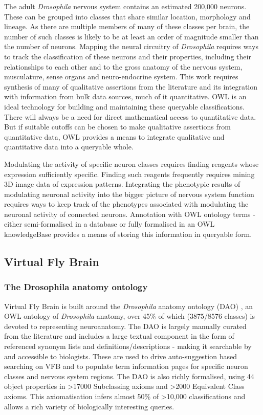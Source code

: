 \documentclass[runningheads,a4paper]{llncs}
\begin{document}
The adult \textit{Drosophila} nervous system contains an estimated
200,000 neurons.  These can be grouped into classes that share
similar location, morphology and lineage.  As there are multiple
members of many of these classes per brain, the number of such classes
is likely to be at least an order of magnitude smaller than the number
of neurons.  Mapping the neural circuitry of \textit{Drosophila}
requires ways to track the classification of these neurons and their
properties, including their relationships to each other and to the
gross anatomy of the nervous system, musculature, sense organs and
neuro-endocrine system.  This work requires synthesis of many of
qualitative assertions from the literature and its integration with
information from bulk data sources, much of it quantitative.  OWL
is an ideal technology for building and maintaining these queryable
classifications. There will always be a need for direct mathematical
access to quantitative data.  But if suitable cutoffs can be
chosen to make qualitative assertions from quantitative data, OWL
provides a means to integrate qualitative and quantitative data into a
queryable whole.

Modulating the activity of specific neuron classes requires finding
reagents whose expression sufficiently specific. Finding such reagents
frequently requires mining 3D image data of expression patterns.
Integrating the phenotypic results of modulating neuronal activity
into the bigger picture of nervous system function requires ways to
keep track of the phenotypes associated with modulating the neuronal
activity of connected neurons.  Annotation with OWL ontology terms -
either semi-formalised in a database or fully formalised in an OWL
knowledgeBase provides a means of storing this information in
queryable form.

\subsection{Virtual Fly Brain}

\subsubsection{The Drosophila anatomy ontology}

Virtual Fly Brain is built around the \textit{Drosophila} anatomy
ontology (DAO) \cite{Costa2013}, an OWL ontology of
\textit{Drosophila} anatomy, over 45\% of which (3875/8576 classes) is
devoted to representing neuroanatomy. The DAO is largely manually
curated from the literature and includes a large textual component in
the form of referenced synonym lists and definitions/descriptions -
making it searchable by and accessible to biologists.  These are used
to drive auto-suggestion based searching on VFB and to populate term
information pages for specific neuron classes and nervous system
regions. The DAO is also richly formalised, using 44 object properties
in \textgreater 17000 Subclassing axioms and \textgreater 2000
Equivalent Class axioms.  This axiomatisation infers almost 50\% of
\textgreater 10,000 classifications and allows a rich variety of
biologically interesting queries.
\end{document}
